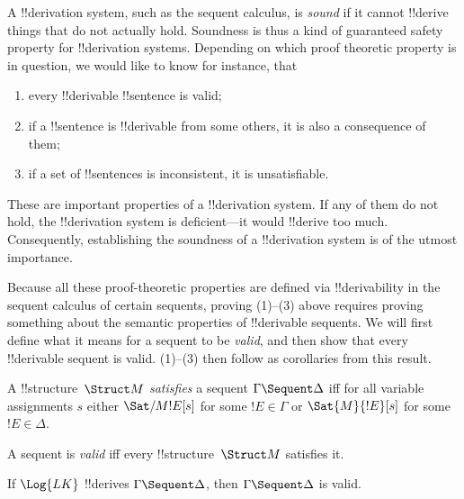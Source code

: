 \documentclass[../../../include/open-logic-section]{subfiles}
\begin{document}

\begin{explain}
A !!{derivation} system, such as the sequent calculus, is \emph{sound}
if it cannot !!{derive} things that do not actually hold.  Soundness is
thus a kind of guaranteed safety property for !!{derivation} systems.
Depending on which proof theoretic property is in question, we would
like to know for instance, that
\begin{enumerate}
\item every !!{derivable} !!{sentence} is valid;
\item if a !!{sentence} is !!{derivable} from some others, it is also a
  consequence of them;
\item if a set of !!{sentence}s is inconsistent, it is unsatisfiable.
\end{enumerate}
These are important properties of a !!{derivation} system.  If any of them do
not hold, the !!{derivation} system is deficient---it would !!{derive} too much.
Consequently, establishing the soundness of a !!{derivation} system is of the
utmost importance.

Because all these proof-theoretic properties are
defined via !!{derivability} in the sequent calculus of certain sequents,
proving (1)--(3) above requires proving something about the semantic
properties of !!{derivable} sequents.  We will first define what it means
for a sequent to be \emph{valid}, and then show that every !!{derivable}
sequent is valid.  (1)--(3) then follow as corollaries from this
result.
\end{explain}

\begin{defn}
A !!{structure}~$\Struct M$ \emph{satisfies} a sequent $\Gamma
\Sequent \Delta$ iff for all variable assignments $s$ either $\Sat/{M}{!E}[s]$
for some $!E \in \Gamma$ or $\Sat{M}{!E}[s]$ for some $!E \in \Delta$.

A sequent is \emph{valid} iff every !!{structure}~$\Struct M$
satisfies it.
\end{defn}

\begin{thm}[Soundness]
 If $\Log{LK}$ !!{derive}s $\Gamma \Sequent
\Delta$, then $\Gamma \Sequent \Delta$ is valid.
\end{thm}
\end{document}
